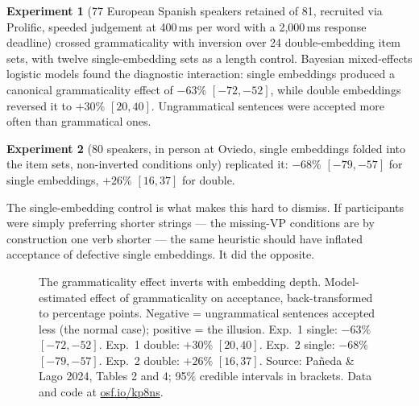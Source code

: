 \documentclass[11pt, a4paper]{article}
\begin{document}
\vspace{0.6em}
\textbf{Experiment 1} (77 European Spanish speakers retained of 81, recruited via Prolific, speeded judgement at 400\,ms per word with a 2,000\,ms response deadline) crossed grammaticality with inversion over 24 double-embedding item sets, with twelve single-embedding sets as a length control. Bayesian mixed-effects logistic models found the diagnostic interaction: single embeddings produced a canonical grammaticality effect of $-63\%$ $[-72,-52]$, while double embeddings reversed it to $+30\%$ $[20,40]$. Ungrammatical sentences were accepted more often than grammatical ones.

\textbf{Experiment 2} (80 speakers, in person at Oviedo, single embeddings folded into the item sets, non-inverted conditions only) replicated it: $-68\%$ $[-79,-57]$ for single embeddings, $+26\%$ $[16,37]$ for double.

The single-embedding control is what makes this hard to dismiss. If participants were simply preferring shorter strings --- the missing-VP conditions are by construction one verb shorter --- the same heuristic should have inflated acceptance of defective single embeddings. It did the opposite.

\begin{figure}[htb]
\centering
{}
\caption{The grammaticality effect inverts with embedding depth. Model-estimated effect of grammaticality on acceptance, back-transformed to percentage points. Negative = ungrammatical sentences accepted less (the normal case); positive = the illusion. Exp.\ 1 single: $-63\%$ $[-72,-52]$. Exp.\ 1 double: $+30\%$ $[20,40]$. Exp.\ 2 single: $-68\%$ $[-79,-57]$. Exp.\ 2 double: $+26\%$ $[16,37]$. Source: Pañeda \& Lago 2024, Tables 2 and 4; 95\% credible intervals in brackets. Data and code at \href{https://osf.io/kp8ns/}{osf.io/kp8ns}.}
\end{figure}
\end{document}

